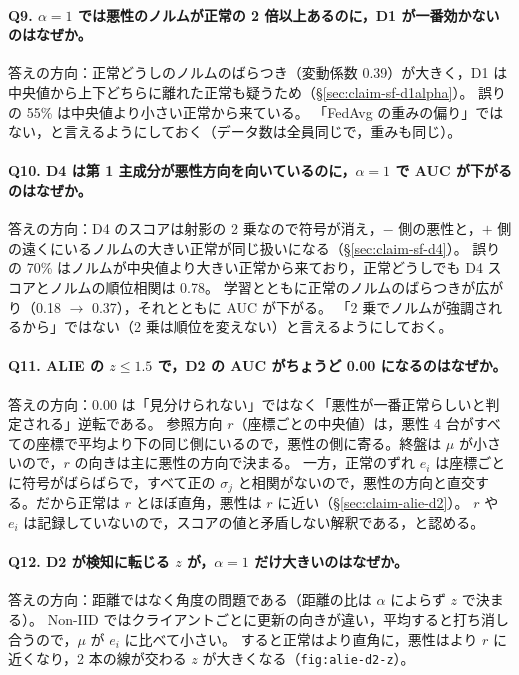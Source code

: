 \documentclass[a4j, dvipdfmx]{jsarticle}  %
\begin{document}
\paragraph{Q9. $\alpha = 1$ では悪性のノルムが正常の 2 倍以上あるのに，D1 が一番効かないのはなぜか。}
答えの方向：正常どうしのノルムのばらつき（変動係数 0.39）が大きく，D1 は中央値から上下どちらに離れた正常も疑うため（\S\ref{sec:claim-sf-d1alpha}）。
誤りの 55\% は中央値より小さい正常から来ている。
「FedAvg の重みの偏り」ではない，と言えるようにしておく（データ数は全員同じで，重みも同じ）。

\paragraph{Q10. D4 は第 1 主成分が悪性方向を向いているのに，$\alpha = 1$ で AUC が下がるのはなぜか。}
答えの方向：D4 のスコアは射影の 2 乗なので符号が消え，$-$ 側の悪性と，$+$ 側の遠くにいるノルムの大きい正常が同じ扱いになる（\S\ref{sec:claim-sf-d4}）。
誤りの 70\% はノルムが中央値より大きい正常から来ており，正常どうしでも D4 スコアとノルムの順位相関は 0.78。
学習とともに正常のノルムのばらつきが広がり（0.18 $\rightarrow$ 0.37），それとともに AUC が下がる。
「2 乗でノルムが強調されるから」ではない（2 乗は順位を変えない）と言えるようにしておく。

\paragraph{Q11. ALIE の $z \le 1.5$ で，D2 の AUC がちょうど 0.00 になるのはなぜか。}
答えの方向：0.00 は「見分けられない」ではなく「悪性が一番正常らしいと判定される」逆転である。
参照方向 $r$（座標ごとの中央値）は，悪性 4 台がすべての座標で平均より下の同じ側にいるので，悪性の側に寄る。終盤は $\mu$ が小さいので，$r$ の向きは主に悪性の方向で決まる。
一方，正常のずれ $e_i$ は座標ごとに符号がばらばらで，すべて正の $\sigma_j$ と相関がないので，悪性の方向と直交する。だから正常は $r$ とほぼ直角，悪性は $r$ に近い（\S\ref{sec:claim-alie-d2}）。
$r$ や $e_i$ は記録していないので，スコアの値と矛盾しない解釈である，と認める。

\paragraph{Q12. D2 が検知に転じる $z$ が，$\alpha = 1$ だけ大きいのはなぜか。}
答えの方向：距離ではなく角度の問題である（距離の比は $\alpha$ によらず $z$ で決まる）。
Non-IID ではクライアントごとに更新の向きが違い，平均すると打ち消し合うので，$\mu$ が $e_i$ に比べて小さい。
すると正常はより直角に，悪性はより $r$ に近くなり，2 本の線が交わる $z$ が大きくなる（\texttt{fig:alie-d2-z}）。
\end{document}
